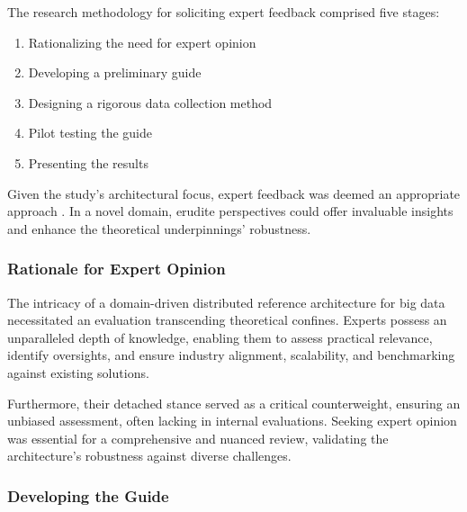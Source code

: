 \documentclass[review]{elsarticle}
\begin{document}
The research methodology for soliciting expert feedback comprised five stages: \begin{enumerate}[label=\alph*)]

  \item Rationalizing the need for expert opinion

  \item Developing a preliminary guide

  \item Designing a rigorous data collection method

  \item Pilot testing the guide

  \item Presenting the results

  \end{enumerate}

  

  Given the study's architectural focus, expert feedback was deemed an appropriate approach \citep{creswell2007qualitative}. In a novel domain, erudite perspectives could offer invaluable insights and enhance the theoretical underpinnings' robustness.

  

  \subsubsection{Rationale for Expert Opinion}

  

  The intricacy of a domain-driven distributed reference architecture for big data necessitated an evaluation transcending theoretical confines. Experts possess an unparalleled depth of knowledge, enabling them to assess practical relevance, identify oversights, and ensure industry alignment, scalability, and benchmarking against existing solutions.

  

  Furthermore, their detached stance served as a critical counterweight, ensuring an unbiased assessment, often lacking in internal evaluations. Seeking expert opinion was essential for a comprehensive and nuanced review, validating the architecture's robustness against diverse challenges.

  

  \subsubsection{Developing the Guide}
\end{document}
